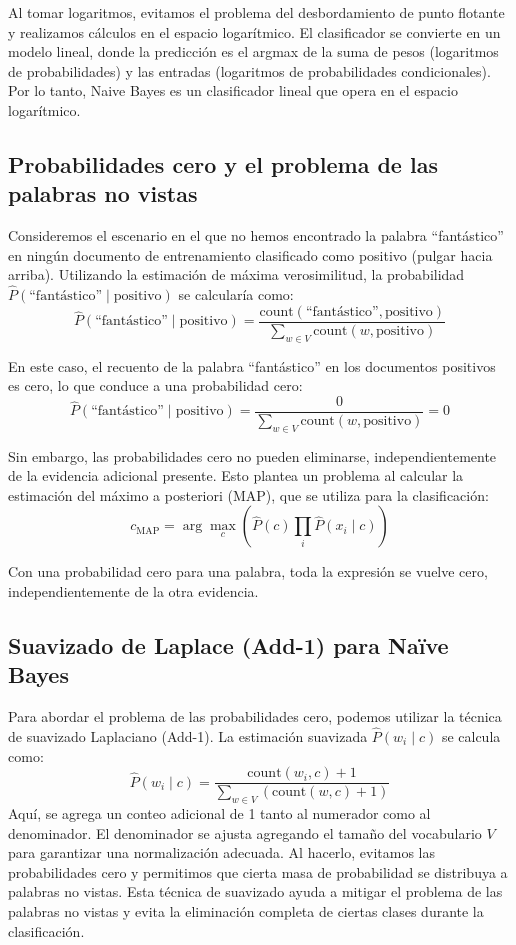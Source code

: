 \documentclass[11pt,fleqn]{book} %
\begin{document}
Al tomar logaritmos, evitamos el problema del desbordamiento de punto flotante y realizamos cálculos en el espacio logarítmico. El clasificador se convierte en un modelo lineal, donde la predicción es el argmax de la suma de pesos (logaritmos de probabilidades) y las entradas (logaritmos de probabilidades condicionales). Por lo tanto, Naive Bayes es un clasificador lineal que opera en el espacio logarítmico.

\subsection{Probabilidades cero y el problema de las palabras no vistas}

Consideremos el escenario en el que no hemos encontrado la palabra ``fantástico'' en ningún documento de entrenamiento clasificado como positivo (pulgar hacia arriba). Utilizando la estimación de máxima verosimilitud, la probabilidad $\hat{P}(\text{``fantástico''} \mid \text{positivo})$ se calcularía como:
\[
\hat{P}(\text{``fantástico''} \mid \text{positivo}) = \frac{\text{count}(\text{``fantástico''}, \text{positivo})}{\sum_{w \in V} \text{count}(w, \text{positivo})}
\]

En este caso, el recuento de la palabra ``fantástico'' en los documentos positivos es cero, lo que conduce a una probabilidad cero:
\[
\hat{P}(\text{``fantástico''} \mid \text{positivo}) = \frac{0}{\sum_{w \in V} \text{count}(w, \text{positivo})} = 0
\]

Sin embargo, las probabilidades cero no pueden eliminarse, independientemente de la evidencia adicional presente. Esto plantea un problema al calcular la estimación del máximo a posteriori (MAP), que se utiliza para la clasificación:
\[
c_{\text{MAP}} = \arg\max_c \left(\hat{P}(c) \prod_{i} \hat{P}(x_i \mid c)\right)
\]

Con una probabilidad cero para una palabra, toda la expresión se vuelve cero, independientemente de la otra evidencia.

\subsection{Suavizado de Laplace (Add-1) para Naïve Bayes}
Para abordar el problema de las probabilidades cero, podemos utilizar la técnica de suavizado Laplaciano (Add-1). La estimación suavizada $\hat{P}(w_i \mid c)$ se calcula como:
    \[
    \hat{P}(w_i \mid c) = \frac{\text{count}(w_i, c) + 1}{\sum_{w \in V} (\text{count}(w, c) + 1)}
    \]
Aquí, se agrega un conteo adicional de 1 tanto al numerador como al denominador. El denominador se ajusta agregando el tamaño del vocabulario $V$ para garantizar una normalización adecuada. Al hacerlo, evitamos las probabilidades cero y permitimos que cierta masa de probabilidad se distribuya a palabras no vistas.  Esta técnica de suavizado ayuda a mitigar el problema de las palabras no vistas y evita la eliminación completa de ciertas clases durante la clasificación.
\end{document}
